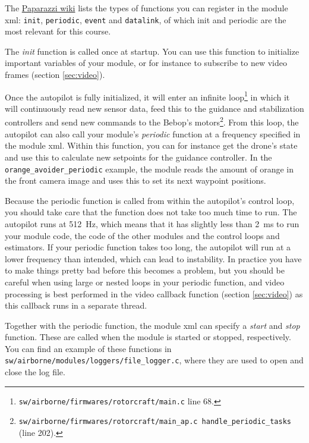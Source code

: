 \documentclass{article}
\begin{document}
The \href{https://wiki.paparazziuav.org/wiki/Modules}{Paparazzi wiki} lists the types of functions you can register in the module xml: \texttt{init}, \texttt{periodic}, \texttt{event} and \texttt{datalink}, of which init and periodic are the most relevant for this course.

The \emph{init} function is called once at startup. You can use this function to initialize important variables of your module, or for instance to subscribe to new video frames (section \ref{sec:video}).

Once the autopilot is fully initialized, it will enter an infinite loop\footnote{\texttt{sw/airborne/firmwares/rotorcraft/main.c} line 68.} in which it will continuously read new sensor data, feed this to the guidance and stabilization controllers and send new commands to the Bebop's motors\footnote{\texttt{sw/airborne/firmwares/rotorcraft/main\_ap.c handle\_periodic\_tasks} (line 202).}.
From this loop, the autopilot can also call your module's \emph{periodic} function at a frequency specified in the module xml. Within this function, you can for instance get the drone's state and use this to calculate new setpoints for the guidance controller. In the \texttt{orange\_avoider\_periodic} example, the module reads the amount of orange in the front camera image and uses this to set its next waypoint positions.

Because the periodic function is called from within the autopilot's control loop, you should take care that the function does not take too much time to run. The autopilot runs at 512~Hz, which means that it has slightly less than 2~ms to run your module code, the code of the other modules and the control loops and estimators. If your periodic function takes too long, the autopilot will run at a lower frequency than intended, which can lead to instability. In practice you have to make things pretty bad before this becomes a problem, but you should be careful when using large or nested loops in your periodic function, and video processing is best performed in the video callback function (section \ref{sec:video}) as this callback runs in a separate thread.

Together with the periodic function, the module xml can specify a \emph{start} and \emph{stop} function. These are called when the module is started or stopped, respectively.
You can find an example of these functions in \texttt{sw/airborne/modules/loggers/file\_logger.c}, where they are used to open and close the log file.
\end{document}
